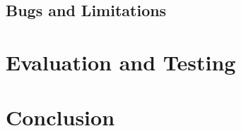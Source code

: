\section{Bugs and Limitations} %


\chapter{Evaluation and Testing}









\chapter{Conclusion}



% 